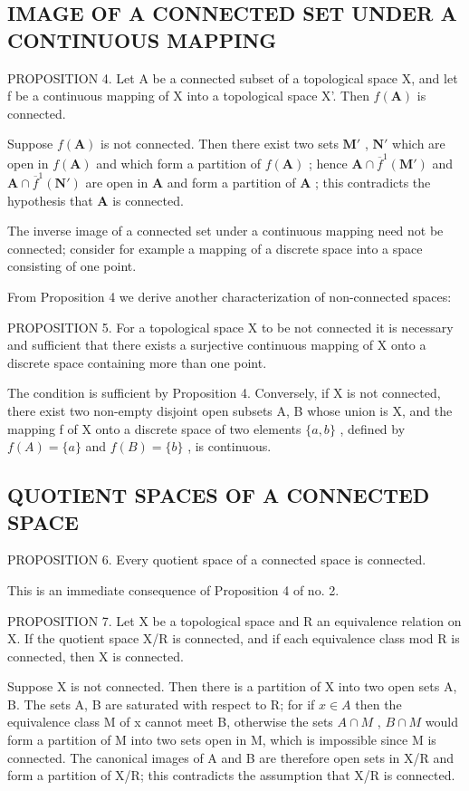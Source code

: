 \subsection{IMAGE OF A CONNECTED SET UNDER A CONTINUOUS MAPPING}

PROPOSITION 4. Let A be a connected subset of a topological space X, and let f be a continuous mapping of X into a topological space X'. Then \(f(\mathbf{A})\) is connected.

Suppose \(f(\mathbf{A})\) is not connected. Then there exist two sets \(\mathbf{M}'\) , \(\mathbf{N}'\) which are open in \(f(\mathbf{A})\) and which form a partition of \(f(\mathbf{A})\) ; hence \(\mathbf{A} \cap \overline{f}^{1}(\mathbf{M}')\) and \(\mathbf{A} \cap \overline{f}^{1}(\mathbf{N}')\) are open in \(\mathbf{A}\) and form a partition of \(\mathbf{A}\) ; this contradicts the hypothesis that \(\mathbf{A}\) is connected.

The inverse image of a connected set under a continuous mapping need not be connected; consider for example a mapping of a discrete space into a space consisting of one point.

From Proposition 4 we derive another characterization of non-connected spaces:

PROPOSITION 5. For a topological space X to be not connected it is necessary and sufficient that there exists a surjective continuous mapping of X onto a discrete space containing more than one point.

The condition is sufficient by Proposition 4. Conversely, if X is not connected, there exist two non-empty disjoint open subsets A, B whose union is X, and the mapping f of X onto a discrete space of two elements \(\{a, b\}\) , defined by \(f(A) = \{a\}\) and \(f(B) = \{b\}\) , is continuous.

\subsection{QUOTIENT SPACES OF A CONNECTED SPACE}

PROPOSITION 6. Every quotient space of a connected space is connected.

This is an immediate consequence of Proposition 4 of no. 2.

PROPOSITION 7. Let X be a topological space and R an equivalence relation on X. If the quotient space X/R is connected, and if each equivalence class mod R is connected, then X is connected.

Suppose X is not connected. Then there is a partition of X into two open sets A, B. The sets A, B are saturated with respect to R; for if \(x \in A\) then the equivalence class M of x cannot meet B, otherwise the sets \(A \cap M\) , \(B \cap M\) would form a partition of M into two sets open in M, which is impossible since M is connected. The canonical images of A and B are therefore open sets in X/R and form a partition of X/R; this contradicts the assumption that X/R is connected.

